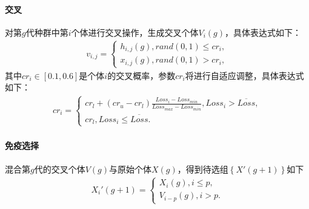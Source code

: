 \documentclass{whutmod}
\begin{document}
		\paragraph{交叉}
		对第$g$代种群中第$i$个体进行交叉操作，生成交叉个体$V_i(g)$，具体表达式如下：
		\begin{gather}
		v_{i,j}=\left\{\begin{matrix}h_{i,j}(g),rand(0,1)\leq cr_{i},
		\\ x_{i,j}(g),rand(0,1)>cr_{i},
		\end{matrix}\right.
		\end{gather}
     	其中$cr_{i}\in[0.1,0.6]$是个体$i$的交叉概率，参数$cr_{i}$将进行自适应调整，具体表达式如下：
		\begin{gather}
		cr_{i}=\left\{\begin{matrix}cr_{l}+(cr_{u}-cr_{l})\frac{Loss_{i}-Loss_{min}}{Loss_{max}-Loss_{min}} , Loss_{i}>\overline{Loss},
		\\ cr_{l},Loss_{i}\leqslant  \overline{Loss}.
		\end{matrix}\right.
		\end{gather}
	    \paragraph{免疫选择}
	    混合第$g$代的交叉个体$V(g)$与原始个体$X(g)$，得到待选组$\left \{ X '(g+1)\right \}$如下
	    \begin{gather*}
	    X_i '(g+1)=\left\{\begin{matrix}  X_i (g),i\leqslant p,
	    \\  V_{i-p} (g),i>p.
	    \end{matrix}\right.
	    \end{gather*}
	    
\end{document}
